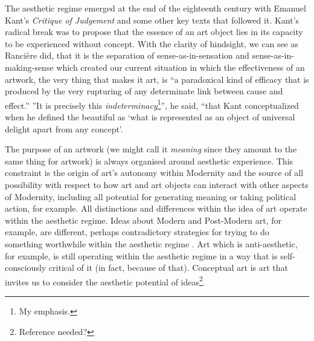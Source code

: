 \documentclass[letterpaper]{article}
\begin{document}
    The aesthetic regime emerged at the end of the eighteenth century with Emanuel Kant's \emph{Critique of Judgement} and some other key texts that followed it. Kant's radical break was to propose that the essence of an art object lies in its capacity to be experienced without concept. With the clarity of hindsight, we can see as Rancière did, that it is the separation of sense-as-in-sensation and sense-as-in-making-sense which created our current situation in which the effectiveness of an artwork, the very thing that makes it art, is “a paradoxical kind of efficacy that is produced by the very rupturing of any determinate link between cause and effect.” \citep[p.51]{RancierThEmncptdSpcttr2009} ”It is precisely this \emph{indeterminacy}\footnote{
        My emphasis.
    }”, he said, “that Kant conceptualized when he defined the beautiful as ‘what is represented as an object of universal delight apart from any concept’. \citep[p.52]{RancierThEmncptdSpcttr2009}

    The purpose of an artwork (we might call it \emph{meaning} since they amount to the same thing for artwork) is always organised around aesthetic experience. This constraint is the origin of art's autonomy within Modernity and the source of all possibility with respect to how art and art objects can interact with other aspects of Modernity, including all potential for generating meaning or taking political action, for example. All distinctions and differences within the idea of art operate within the aesthetic regime. Ideas about Modern and Post-Modern art, for example, are different, perhaps contradictory strategies for trying to do something worthwhile within the aesthetic regime \citep[p213]{ZepkeSblmArt2017}. Art which is anti-aesthetic, for example, is still operating within the aesthetic regime in a way that is self-consciously critical of it (in fact, because of that). Conceptual art is art that invites us to consider the aesthetic potential of ideas\footnote{
        Reference needed?
    }.
\end{document}
